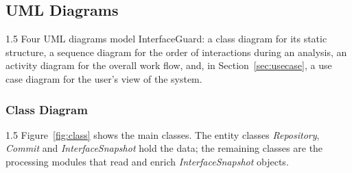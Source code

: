 \documentclass[12pt,a4paper]{article}
\begin{document}
\subsection{UML Diagrams}

\begin{spacing}{1.5}
\justifying
Four UML diagrams model InterfaceGuard: a class diagram for its static
structure, a sequence diagram for the order of interactions during an
analysis, an activity diagram for the overall work flow, and, in
Section~\ref{sec:usecase}, a use case diagram for the user's view of the
system.
\end{spacing}

\subsubsection{Class Diagram}

\begin{spacing}{1.5}
\justifying
Figure~\ref{fig:class} shows the main classes. The entity classes
\textit{Repository}, \textit{Commit} and \textit{Interface\-Snapshot} hold the
data; the remaining classes are the processing modules that read and enrich
\textit{Interface\-Snapshot} objects.
\end{spacing}
\end{document}
